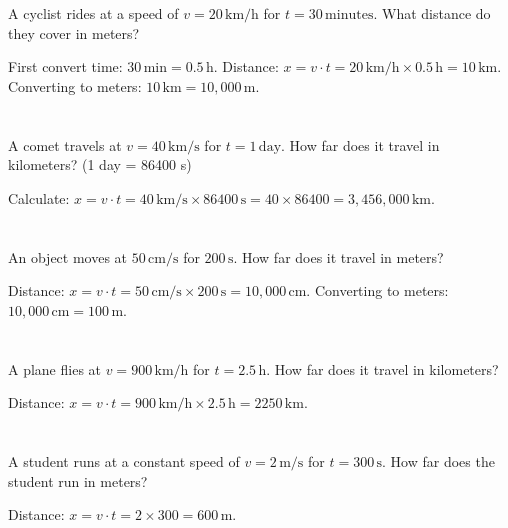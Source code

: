 \documentclass{article}
\begin{document}
\section{}
A cyclist rides at a speed of \( v = 20 \, \mathrm{km/h} \) for \( t = 30 \, \mathrm{minutes} \). What distance do they cover in meters?

First convert time: \(30 \, \mathrm{min} = 0.5 \, \mathrm{h}\). Distance: \( x = v \cdot t = 20 \, \mathrm{km/h} \times 0.5 \, \mathrm{h} = 10 \, \mathrm{km} \). Converting to meters: \(10 \, \mathrm{km} = 10{,}000 \, \mathrm{m}\).

\section{}
A comet travels at \( v = 40 \, \mathrm{km/s} \) for \( t = 1 \, \mathrm{day} \). How far does it travel in kilometers? (1 day = 86400 s)

Calculate: \( x = v \cdot t = 40 \, \mathrm{km/s} \times 86400 \, \mathrm{s} = 40 \times 86400 = 3{,}456{,}000 \, \mathrm{km} \).

\section{}
An object moves at \( 50 \, \mathrm{cm/s} \) for \( 200 \, \mathrm{s} \). How far does it travel in meters?

Distance: \( x = v \cdot t = 50 \, \mathrm{cm/s} \times 200 \, \mathrm{s} = 10{,}000 \, \mathrm{cm} \). Converting to meters: \(10{,}000 \, \mathrm{cm} = 100 \, \mathrm{m}\).

\section{}
A plane flies at \( v = 900 \, \mathrm{km/h} \) for \( t = 2.5 \, \mathrm{h} \). How far does it travel in kilometers?

Distance: \( x = v \cdot t = 900 \, \mathrm{km/h} \times 2.5 \, \mathrm{h} = 2250 \, \mathrm{km} \).

\section{}
A student runs at a constant speed of \( v = 2 \, \mathrm{m/s} \) for \( t = 300 \, \mathrm{s} \). How far does the student run in meters?

Distance: \( x = v \cdot t = 2 \times 300 = 600 \, \mathrm{m} \).
\end{document}
